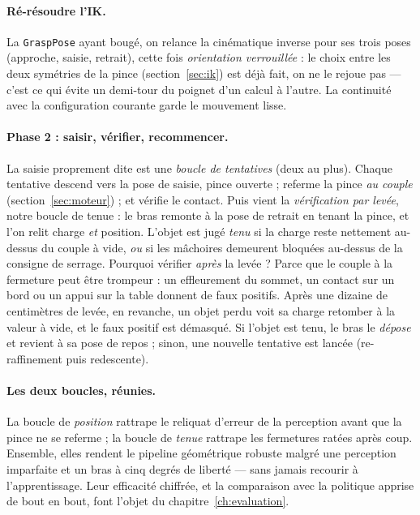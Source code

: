 \paragraph{Ré-résoudre l'IK.} La \texttt{GraspPose} ayant bougé, on relance la cinématique inverse pour ses trois poses (approche, saisie, retrait), cette fois \emph{orientation verrouillée} : le choix entre les deux symétries de la pince (section~\ref{sec:ik}) est déjà fait, on ne le rejoue pas --- c'est ce qui évite un demi-tour du poignet d'un calcul à l'autre. La continuité avec la configuration courante garde le mouvement lisse.

\paragraph{Phase 2 : saisir, vérifier, recommencer.} La saisie proprement dite est une \emph{boucle de tentatives} (deux au plus). Chaque tentative descend vers la pose de saisie, pince ouverte ; referme la pince \emph{au couple} (section~\ref{sec:moteur}) ; et vérifie le contact. Puis vient la \emph{vérification par levée}, notre boucle de tenue : le bras remonte à la pose de retrait en tenant la pince, et l'on relit charge \emph{et} position. L'objet est jugé \emph{tenu} si la charge reste nettement au-dessus du couple à vide, \emph{ou} si les mâchoires demeurent bloquées au-dessus de la consigne de serrage. Pourquoi vérifier \emph{après} la levée ? Parce que le couple à la fermeture peut être trompeur : un effleurement du sommet, un contact sur un bord ou un appui sur la table donnent de faux positifs. Après une dizaine de centimètres de levée, en revanche, un objet perdu voit sa charge retomber à la valeur à vide, et le faux positif est démasqué. Si l'objet est tenu, le bras le \emph{dépose} et revient à sa pose de repos ; sinon, une nouvelle tentative est lancée (re-raffinement puis redescente).

\paragraph{Les deux boucles, réunies.} La boucle de \emph{position} rattrape le reliquat d'erreur de la perception avant que la pince ne se referme ; la boucle de \emph{tenue} rattrape les fermetures ratées après coup. Ensemble, elles rendent le pipeline géométrique robuste malgré une perception imparfaite et un bras à cinq degrés de liberté --- sans jamais recourir à l'apprentissage. Leur efficacité chiffrée, et la comparaison avec la politique apprise de bout en bout, font l'objet du chapitre~\ref{ch:evaluation}.

